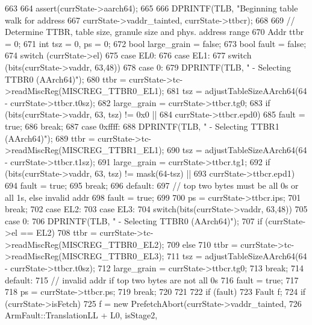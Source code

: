 \begin{DoxyCode}
663 {
664     assert(currState->aarch64);
665 
666     DPRINTF(TLB, "Beginning table walk for address %
667             currState->vaddr_tainted, currState->ttbcr);
668 
669     // Determine TTBR, table size, granule size and phys. address range
670     Addr ttbr = 0;
671     int tsz = 0, ps = 0;
672     bool large_grain = false;
673     bool fault = false;
674     switch (currState->el) {
675       case EL0:
676       case EL1:
677         switch (bits(currState->vaddr, 63,48)) {
678           case 0:
679             DPRINTF(TLB, " - Selecting TTBR0 (AArch64)\n");
680             ttbr = currState->tc->readMiscReg(MISCREG_TTBR0_EL1);
681             tsz = adjustTableSizeAArch64(64 - currState->ttbcr.t0sz);
682             large_grain = currState->ttbcr.tg0;
683             if (bits(currState->vaddr, 63, tsz) != 0x0 ||
684                 currState->ttbcr.epd0)
685               fault = true;
686             break;
687           case 0xffff:
688             DPRINTF(TLB, " - Selecting TTBR1 (AArch64)\n");
689             ttbr = currState->tc->readMiscReg(MISCREG_TTBR1_EL1);
690             tsz = adjustTableSizeAArch64(64 - currState->ttbcr.t1sz);
691             large_grain = currState->ttbcr.tg1;
692             if (bits(currState->vaddr, 63, tsz) != mask(64-tsz) ||
693                 currState->ttbcr.epd1)
694               fault = true;
695             break;
696           default:
697             // top two bytes must be all 0s or all 1s, else invalid addr
698             fault = true;
699         }
700         ps = currState->ttbcr.ips;
701         break;
702       case EL2:
703       case EL3:
704         switch(bits(currState->vaddr, 63,48)) {
705             case 0:
706         DPRINTF(TLB, " - Selecting TTBR0 (AArch64)\n");
707         if (currState->el == EL2)
708             ttbr = currState->tc->readMiscReg(MISCREG_TTBR0_EL2);
709         else
710             ttbr = currState->tc->readMiscReg(MISCREG_TTBR0_EL3);
711         tsz = adjustTableSizeAArch64(64 - currState->ttbcr.t0sz);
712         large_grain = currState->ttbcr.tg0;
713                 break;
714             default:
715                 // invalid addr if top two bytes are not all 0s
716             fault = true;
717         }
718         ps = currState->ttbcr.ps;
719         break;
720     }
721 
722     if (fault) {
723         Fault f;
724         if (currState->isFetch)
725             f =  new PrefetchAbort(currState->vaddr_tainted,
726                                      ArmFault::TranslationLL + L0, isStage2,
}}
\end{DoxyCode}
